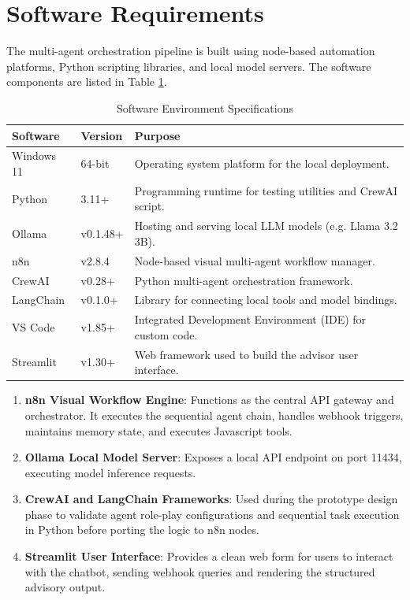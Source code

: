 \section{Software Requirements}
The multi-agent orchestration pipeline is built using node-based automation platforms, Python scripting libraries, and local model servers. The software components are listed in Table \ref{table:software_req}.

\begin{table}[H]
    \centering
    \caption{Software Environment Specifications}
    \label{table:software_req}
    \begin{tabular}{llp{7.5cm}}
        \toprule
        \textbf{Software} & \textbf{Version} & \textbf{Purpose} \\
        \midrule
        Windows 11 & 64-bit & Operating system platform for the local deployment. \\
        Python & 3.11+ & Programming runtime for testing utilities and CrewAI script. \\
        Ollama & v0.1.48+ & Hosting and serving local LLM models (e.g. Llama 3.2 3B). \\
        n8n & v2.8.4 & Node-based visual multi-agent workflow manager. \\
        CrewAI & v0.28+ & Python multi-agent orchestration framework. \\
        LangChain & v0.1.0+ & Library for connecting local tools and model bindings. \\
        VS Code & v1.85+ & Integrated Development Environment (IDE) for custom code. \\
        Streamlit & v1.30+ & Web framework used to build the advisor user interface. \\
        \bottomrule
    \end{tabular}
\end{table}

\begin{enumerate}
    \item \textbf{n8n Visual Workflow Engine}: Functions as the central API gateway and orchestrator. It executes the sequential agent chain, handles webhook triggers, maintains memory state, and executes Javascript tools.
    \item \textbf{Ollama Local Model Server}: Exposes a local API endpoint on port 11434, executing model inference requests.
    \item \textbf{CrewAI and LangChain Frameworks}: Used during the prototype design phase to validate agent role-play configurations and sequential task execution in Python before porting the logic to n8n nodes.
    \item \textbf{Streamlit User Interface}: Provides a clean web form for users to interact with the chatbot, sending webhook queries and rendering the structured advisory output.
\end{enumerate}
